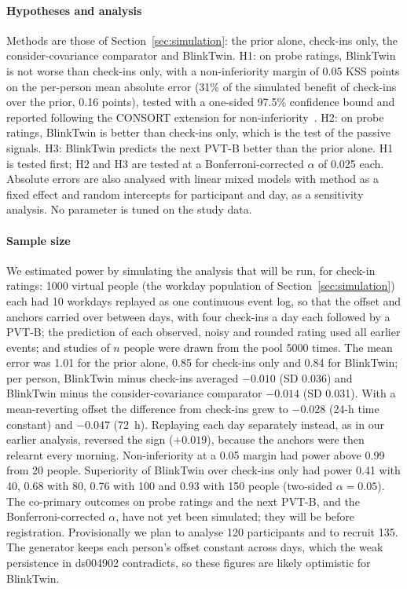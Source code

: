 \paragraph*{Hypotheses and analysis} Methods are those of Section~\ref{sec:simulation}: the prior alone, check-ins only, the consider-covariance comparator and BlinkTwin. H1: on probe ratings, BlinkTwin is not worse than check-ins only, with a non-inferiority margin of 0.05 KSS points on the per-person mean absolute error (31\% of the simulated benefit of check-ins over the prior, 0.16 points), tested with a one-sided 97.5\% confidence bound and reported following the CONSORT extension for non-inferiority~\cite{piaggio2012reporting}. H2: on probe ratings, BlinkTwin is better than check-ins only, which is the test of the passive signals. H3: BlinkTwin predicts the next PVT-B better than the prior alone. H1 is tested first; H2 and H3 are tested at a Bonferroni-corrected $\alpha$ of 0.025 each. Absolute errors are also analysed with linear mixed models with method as a fixed effect and random intercepts for participant and day, as a sensitivity analysis. No parameter is tuned on the study data.

\paragraph*{Sample size} We estimated power by simulating the analysis that will be run, for check-in ratings: 1000 virtual people (the workday population of Section~\ref{sec:simulation}) each had 10 workdays replayed as one continuous event log, so that the offset and anchors carried over between days, with four check-ins a day each followed by a PVT-B; the prediction of each observed, noisy and rounded rating used all earlier events; and studies of $n$ people were drawn from the pool 5000 times. The mean error was 1.01 for the prior alone, 0.85 for check-ins only and 0.84 for BlinkTwin; per person, BlinkTwin minus check-ins averaged $-0.010$ (SD 0.036) and BlinkTwin minus the consider-covariance comparator $-0.014$ (SD 0.031). With a mean-reverting offset the difference from check-ins grew to $-0.028$ (24-h time constant) and $-0.047$ (72~h). Replaying each day separately instead, as in our earlier analysis, reversed the sign ($+0.019$), because the anchors were then relearnt every morning. Non-inferiority at a 0.05 margin had power above 0.99 from 20 people. Superiority of BlinkTwin over check-ins only had power 0.41 with 40, 0.68 with 80, 0.76 with 100 and 0.93 with 150 people (two-sided $\alpha = 0.05$). The co-primary outcomes on probe ratings and the next PVT-B, and the Bonferroni-corrected $\alpha$, have not yet been simulated; they will be before registration. Provisionally we plan to analyse 120 participants and to recruit 135. The generator keeps each person's offset constant across days, which the weak persistence in ds004902 contradicts, so these figures are likely optimistic for BlinkTwin.
